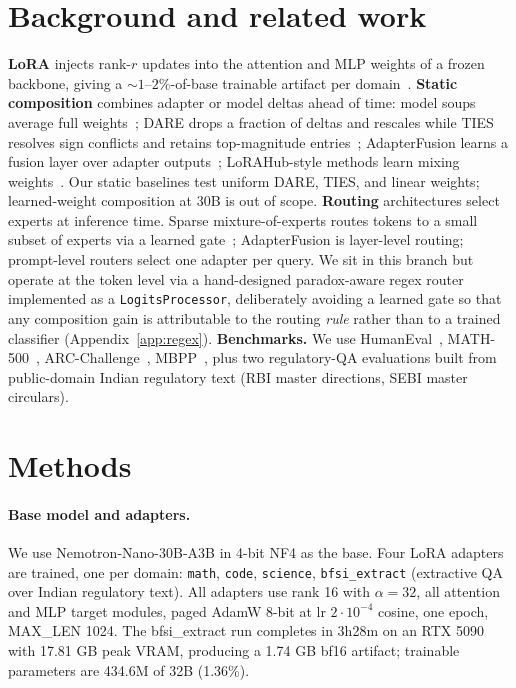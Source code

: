 \documentclass{article}
\begin{document}
\section{Background and related work}

\textbf{LoRA} injects rank-$r$ updates into the attention and MLP weights of a frozen backbone, giving a $\sim 1$--$2\%$-of-base trainable artifact per domain~\cite{hu2021lora}. \textbf{Static composition} combines adapter or model deltas ahead of time: model soups average full weights~\cite{wortsman2022model}; DARE drops a fraction of deltas and rescales while TIES resolves sign conflicts and retains top-magnitude entries~\cite{edalati2023absorbing}; AdapterFusion learns a fusion layer over adapter outputs~\cite{pfeiffer2020adapterfusion}; LoRAHub-style methods learn mixing weights~\cite{quarantiello2024adaptive}. Our static baselines test uniform DARE, TIES, and linear weights; learned-weight composition at 30B is out of scope. \textbf{Routing} architectures select experts at inference time. Sparse mixture-of-experts routes tokens to a small subset of experts via a learned gate~\cite{shazeer2017moe,fedus2021switch}; AdapterFusion is layer-level routing; prompt-level routers select one adapter per query. We sit in this branch but operate at the token level via a hand-designed paradox-aware regex router implemented as a \texttt{LogitsProcessor}, deliberately avoiding a learned gate so that any composition gain is attributable to the routing \emph{rule} rather than to a trained classifier (Appendix~\ref{app:regex}). \textbf{Benchmarks.} We use HumanEval~\cite{chen2021evaluating}, MATH-500~\cite{hendrycks2021math}, ARC-Challenge~\cite{clark2018arc}, MBPP~\cite{austin2021mbpp}, plus two regulatory-QA evaluations built from public-domain Indian regulatory text (RBI master directions, SEBI master circulars).

\section{Methods}

\paragraph{Base model and adapters.} We use Nemotron-Nano-30B-A3B in 4-bit NF4 as the base. Four LoRA adapters are trained, one per domain: \texttt{math}, \texttt{code}, \texttt{science}, \texttt{bfsi\_extract} (extractive QA over Indian regulatory text). All adapters use rank 16 with $\alpha = 32$, all attention and MLP target modules, paged AdamW 8-bit at lr $2{\cdot}10^{-4}$ cosine, one epoch, MAX\_LEN 1024. The bfsi\_extract run completes in 3h28m on an RTX 5090 with 17.81 GB peak VRAM, producing a 1.74 GB bf16 artifact; trainable parameters are 434.6M of 32B (1.36\%).
\end{document}

